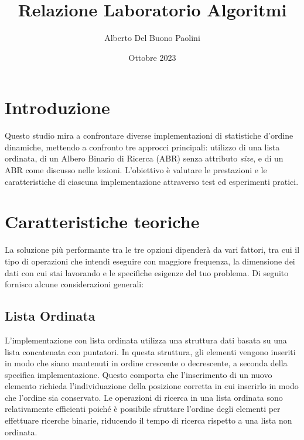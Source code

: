 \documentclass[twocolumn]{article}
\title{Relazione Laboratorio Algoritmi}
\author{Alberto Del Buono Paolini}
\date{Ottobre 2023}
\begin{document}
\begin{onecolumn}
\maketitle
\tableofcontents
\vspace{3cm}
\end{onecolumn}
\pagebreak


\section{Introduzione}

Questo studio mira a confrontare diverse implementazioni di statistiche d'ordine dinamiche, mettendo a confronto tre approcci principali: utilizzo di una lista ordinata, di un Albero Binario di Ricerca (ABR) senza attributo \textit{size}, e di un ABR come discusso nelle lezioni. L'obiettivo è valutare le prestazioni e le caratteristiche di ciascuna implementazione attraverso test ed esperimenti pratici.

\section{Caratteristiche teoriche}

La soluzione più performante tra le tre opzioni dipenderà da vari fattori, tra cui il tipo di operazioni che intendi eseguire con maggiore frequenza, la dimensione dei dati con cui stai lavorando e le specifiche esigenze del tuo problema. Di seguito fornisco alcune considerazioni generali:

\subsection{Lista Ordinata}

L'implementazione con lista ordinata utilizza una struttura dati basata su una lista concatenata con puntatori. In questa struttura, gli elementi vengono inseriti in modo che siano mantenuti in ordine crescente o decrescente, a seconda della specifica implementazione. Questo comporta che l'inserimento di un nuovo elemento richieda l'individuazione della posizione corretta in cui inserirlo in modo che l'ordine sia conservato. Le operazioni di ricerca in una lista ordinata sono relativamente efficienti poiché è possibile sfruttare l'ordine degli elementi per effettuare ricerche binarie, riducendo il tempo di ricerca rispetto a una lista non ordinata.
\end{document}
